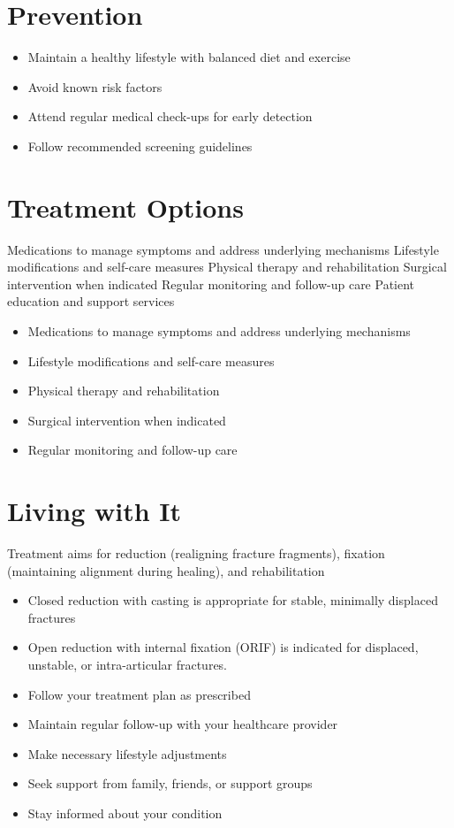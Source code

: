 \section{Prevention}
\begin{itemize}[noitemsep]
  \item Maintain a healthy lifestyle with balanced diet and exercise
  \item Avoid known risk factors
  \item Attend regular medical check-ups for early detection
  \item Follow recommended screening guidelines
\end{itemize}
\section{Treatment Options}
Medications to manage symptoms and address underlying mechanisms Lifestyle modifications and self-care measures Physical therapy and rehabilitation Surgical intervention when indicated Regular monitoring and follow-up care Patient education and support services

\begin{itemize}[noitemsep]
  \item Medications to manage symptoms and address underlying mechanisms
  \item Lifestyle modifications and self-care measures
  \item Physical therapy and rehabilitation
  \item Surgical intervention when indicated
  \item Regular monitoring and follow-up care
\end{itemize}
\section{Living with It}
Treatment aims for reduction (realigning fracture fragments), fixation (maintaining alignment during healing), and rehabilitation

\begin{itemize}[noitemsep]
  \item Closed reduction with casting is appropriate for stable, minimally displaced fractures
  \item Open reduction with internal fixation (ORIF) is indicated for displaced, unstable, or intra-articular fractures.
  \item Follow your treatment plan as prescribed
  \item Maintain regular follow-up with your healthcare provider
  \item Make necessary lifestyle adjustments
  \item Seek support from family, friends, or support groups
  \item Stay informed about your condition
\end{itemize}
